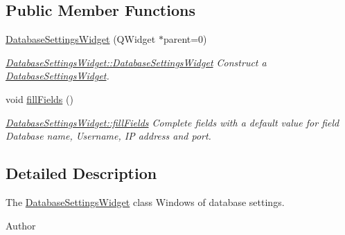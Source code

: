 \subsection*{Public Member Functions}
\begin{DoxyCompactItemize}
\item 
\hyperlink{classGui_1_1Widgets_1_1DatabaseSettingsWidget_a723805fcd8e71878c6d66b7296f16d85}{Database\-Settings\-Widget} (Q\-Widget $\ast$parent=0)
\begin{DoxyCompactList}\small\item\em \hyperlink{classGui_1_1Widgets_1_1DatabaseSettingsWidget_a723805fcd8e71878c6d66b7296f16d85}{Database\-Settings\-Widget\-::\-Database\-Settings\-Widget} Construct a \hyperlink{classGui_1_1Widgets_1_1DatabaseSettingsWidget}{Database\-Settings\-Widget}. \end{DoxyCompactList}\item 
\hypertarget{classGui_1_1Widgets_1_1DatabaseSettingsWidget_a79e2fb995dbd14f4c4d0b54bdfaf5d5f}{void \hyperlink{classGui_1_1Widgets_1_1DatabaseSettingsWidget_a79e2fb995dbd14f4c4d0b54bdfaf5d5f}{fill\-Fields} ()}\label{classGui_1_1Widgets_1_1DatabaseSettingsWidget_a79e2fb995dbd14f4c4d0b54bdfaf5d5f}

\begin{DoxyCompactList}\small\item\em \hyperlink{classGui_1_1Widgets_1_1DatabaseSettingsWidget_a79e2fb995dbd14f4c4d0b54bdfaf5d5f}{Database\-Settings\-Widget\-::fill\-Fields} Complete fields with a default value for field Database name, Username, I\-P address and port. \end{DoxyCompactList}\end{DoxyCompactItemize}


\subsection{Detailed Description}
The \hyperlink{classGui_1_1Widgets_1_1DatabaseSettingsWidget}{Database\-Settings\-Widget} class Windows of database settings. 

\begin{DoxyAuthor}{Author}

\end{DoxyAuthor}


